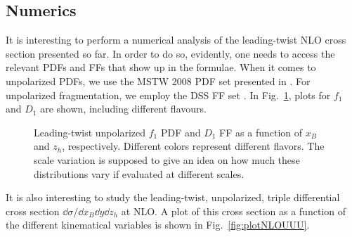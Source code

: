 \subsection{Numerics}
It is interesting to perform a numerical analysis of the leading-twist NLO cross section presented so far. In order to do so, evidently, one needs to access the relevant PDFs and FFs that show up in the formulae. When it comes to unpolarized PDFs, we use the MSTW 2008 PDF set presented in \cite{Martin_2009}. For unpolarized fragmentation, we employ the DSS FF set \cite{de_Florian_2007}. In Fig.~\ref{fig:f1D1}, plots for $f_1$ and $D_1$ are shown, including different flavours.
\begin{figure}
    \centering
    \caption{Leading-twist unpolarized $f_1$ PDF and $D_1$ FF as a function of $x_B$ and $z_h$, respectively. Different colors represent different flavors. The scale variation is supposed to give an idea on how much these distributions vary if evaluated at different scales.}
    \label{fig:f1D1}
\end{figure}
It is also interesting to study the leading-twist, unpolarized, triple differential cross section $\dd \sigma/\dd x_B \dd y \dd z_h$ at NLO. A plot of this cross section as a function of the different kinematical variables is shown in Fig.~\ref{fig:plotNLOUUU}.
